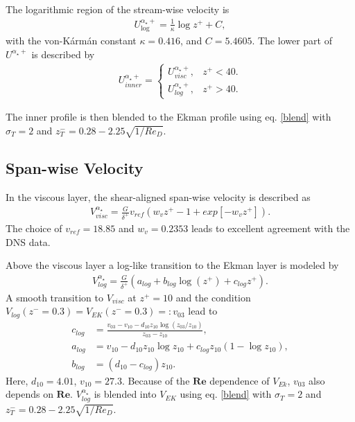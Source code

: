 \documentclass[a4paper,11pt]{article}
\newcommand{\RE}{\mathbf{Re}}
\begin{document}
The logarithmic region of the stream-wise velocity is 
\begin{align}\label{log-law}
  U_{\log}^{\alpha_\star+} = \frac{1}{\kappa}\log z^+ + C,
\end{align}
with the von-Kármán constant $\kappa=0.416$, and $C=5.4605$. The lower part of $U^{\alpha_\star+}$ is described by
\begin{align}
  U_{inner}^{\alpha_\star+} = \begin{cases}
	  U_{visc}^{\alpha_\star+}, & z^+<40.\\
		U_{log}^{\alpha_\star+}, & z^+>40.
	\end{cases}
\end{align}

The inner profile is then blended to the Ekman profile using eq. \ref{blend} with $\sigma_T = 2$ and $z_T^- = 0.28- 2.25\sqrt{1/Re_D}$.

\subsection{Span-wise Velocity}

In the viscous layer, the shear-aligned span-wise velocity is described as
\begin{align}
  V^{\alpha_\star}_{visc} = \frac{G}{\delta^+}v_{ref}(w_vz^+-1+exp[-w_vz^+]).
\end{align}
The choice of $v_{ref} = 18.85$ and $w_v = 0.2353$ leads to excellent agreement with the DNS data.

Above the viscous layer a log-like transition to the Ekman layer is modeled by
\begin{align}
  V_{log}^{\alpha_\star} = \frac{G}{\delta^+}(a_{log} + b_{log}\log(z^+) + c_{log}z^+).
\end{align}
A smooth transition to $V_{visc}$ at $z^+=10$ and the condition $V_{log}(z^-=0.3) = V_{EK}(z^-=0.3) =: v_{03}$ lead to
\begin{align}
  c_{log} &= \frac{v_{03}-v_{10} - d_{10}z_{10}\log(z_{03}/z_{10})}{z_{03}-z_{10}},\\
	a_{log} &= v_{10}-d_{10}z_{10}\log z_{10}+c_{log}z_{10}(1-\log z_{10}),\\
	b_{log} &= (d_{10}-c_{log})z_{10}.
\end{align}
Here, $d_{10}=4.01$, $v_{10}=27.3$. Because of the $\RE$ dependence of $V_{Ek}$, $v_{03}$ also depends on $\RE$. $V_{log}^{\alpha_\star}$ is blended into $V_{EK}$ using eq. \ref{blend} with $\sigma_T = 2$ and $z_T^- = 0.28- 2.25\sqrt{1/Re_D}$.
\end{document}
